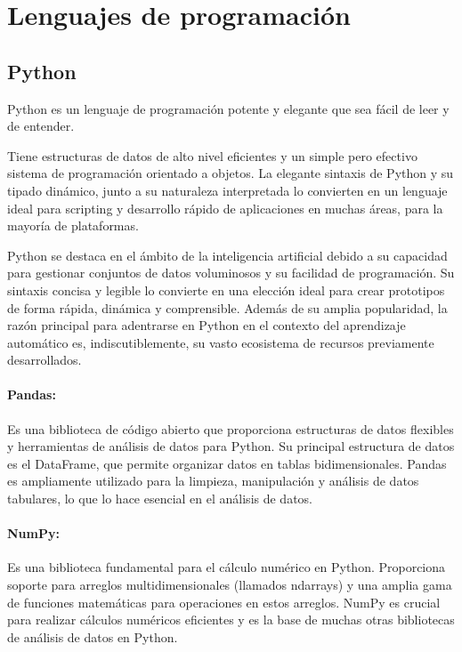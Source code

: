 \section{Lenguajes de programación}

\subsection{Python}
Python es un lenguaje de programación potente y elegante
que sea fácil de leer y de entender\cite{python2021python}.

Tiene estructuras de datos de alto nivel eficientes y un simple pero efectivo sistema de programación orientado a objetos. La elegante sintaxis de Python y su tipado dinámico, junto a su naturaleza interpretada lo convierten en un lenguaje ideal para scripting y desarrollo rápido de aplicaciones en muchas áreas, para la mayoría de plataformas.

Python se destaca en el ámbito de la inteligencia artificial debido a su capacidad para gestionar conjuntos de datos voluminosos y su facilidad de programación. Su sintaxis concisa y legible lo convierte en una elección ideal para crear prototipos de forma rápida, dinámica y comprensible.
Además de su amplia popularidad, la razón principal para adentrarse en Python en el contexto del aprendizaje automático es, indiscutiblemente, su vasto ecosistema de recursos previamente desarrollados. 

\paragraph{Pandas:}
Es una biblioteca de código abierto que proporciona estructuras de datos flexibles y herramientas de análisis de datos para Python. Su principal estructura de datos es el DataFrame, que permite organizar datos en tablas bidimensionales. Pandas es ampliamente utilizado para la limpieza, manipulación y análisis de datos tabulares, lo que lo hace esencial en el análisis de datos.

\paragraph{NumPy:}
Es una biblioteca fundamental para el cálculo numérico en Python. Proporciona soporte para arreglos multidimensionales (llamados ndarrays) y una amplia gama de funciones matemáticas para operaciones en estos arreglos. NumPy es crucial para realizar cálculos numéricos eficientes y es la base de muchas otras bibliotecas de análisis de datos en Python.


